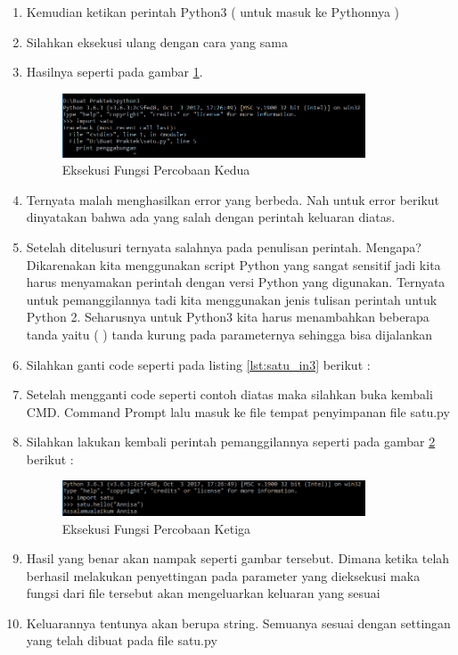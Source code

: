 \begin{enumerate}
\item Kemudian ketikan perintah Python3 ( untuk masuk ke Pythonnya )
\item Silahkan eksekusi ulang dengan cara yang sama
\item Hasilnya seperti pada gambar \ref{fig:eksekusi_fungsi2}.
\begin{figure}[!htbp]
	\centerline{\includegraphics[width=0.85\textwidth]{figures/8/eksekusi_fungsi2.png}}
	\caption{Eksekusi Fungsi Percobaan Kedua}
	\label{fig:eksekusi_fungsi2}
\end{figure}
\item Ternyata malah menghasilkan error yang berbeda. Nah untuk error berikut dinyatakan bahwa ada yang salah dengan perintah keluaran diatas.
\item Setelah ditelusuri ternyata salahnya pada penulisan perintah. Mengapa? Dikarenakan kita menggunakan script Python yang sangat sensitif jadi kita harus menyamakan perintah dengan versi Python yang digunakan. Ternyata untuk pemanggilannya tadi kita menggunakan jenis tulisan perintah untuk Python 2. Seharusnya untuk Python3 kita harus menambahkan beberapa tanda yaitu ( ) tanda kurung pada parameternya sehingga bisa dijalankan
\item Silahkan ganti code seperti pada listing \ref{lst:satu_in3} berikut :

\item Setelah mengganti code seperti contoh diatas maka silahkan buka kembali CMD. Command Prompt lalu masuk ke file tempat penyimpanan file satu.py
\item Silahkan lakukan kembali perintah pemanggilannya seperti pada gambar \ref{fig:eksekusi_fungsi3} berikut :
\begin{figure}[!htbp]
	\centerline{\includegraphics[width=0.85\textwidth]{figures/8/eksekusi_fungsi3.png}}
	\caption{Eksekusi Fungsi Percobaan Ketiga}
	\label{fig:eksekusi_fungsi3}
\end{figure}
\item Hasil yang benar akan nampak seperti gambar tersebut. Dimana ketika telah berhasil melakukan penyettingan pada parameter yang dieksekusi maka fungsi dari file tersebut akan mengeluarkan keluaran yang sesuai
\item Keluarannya tentunya akan berupa string. Semuanya sesuai dengan settingan yang telah dibuat pada file satu.py
\end{enumerate}

